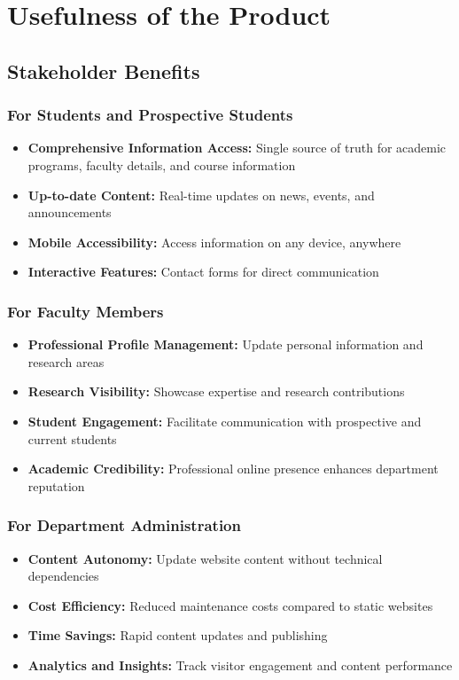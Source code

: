 \documentclass[12pt,a4paper]{report}
\begin{document}
\chapter{Usefulness of the Product}
\label{chap:usefulness}

\section{Stakeholder Benefits}

\subsection{For Students and Prospective Students}
\begin{itemize}
    \item \textbf{Comprehensive Information Access:} Single source of truth for academic programs, faculty details, and course information
    \item \textbf{Up-to-date Content:} Real-time updates on news, events, and announcements
    \item \textbf{Mobile Accessibility:} Access information on any device, anywhere
    \item \textbf{Interactive Features:} Contact forms for direct communication
\end{itemize}

\subsection{For Faculty Members}
\begin{itemize}
    \item \textbf{Professional Profile Management:} Update personal information and research areas
    \item \textbf{Research Visibility:} Showcase expertise and research contributions
    \item \textbf{Student Engagement:} Facilitate communication with prospective and current students
    \item \textbf{Academic Credibility:} Professional online presence enhances department reputation
\end{itemize}

\subsection{For Department Administration}
\begin{itemize}
    \item \textbf{Content Autonomy:} Update website content without technical dependencies
    \item \textbf{Cost Efficiency:} Reduced maintenance costs compared to static websites
    \item \textbf{Time Savings:} Rapid content updates and publishing
    \item \textbf{Analytics and Insights:} Track visitor engagement and content performance
\end{itemize}
\end{document}
